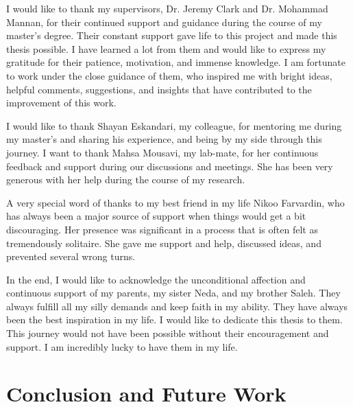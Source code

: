 \documentclass[letterpaper,12pt,onecolumn,final]{report}
\begin{document}
\begin{acknowledgments}
  I would like to thank my supervisors, Dr. Jeremy Clark and Dr. Mohammad Mannan, for their continued support and guidance during the course of my master's degree. Their constant support gave life to this project and made this thesis possible. I have learned a lot from them and would like to express my gratitude for their patience, motivation, and immense knowledge. I am fortunate to work under the close guidance of them, who inspired me with bright ideas, helpful comments, suggestions, and insights that have contributed to the improvement of this work.

  I would like to thank Shayan Eskandari, my colleague, for mentoring me during my master's and sharing his experience, and being by my side through this journey. I want to thank Mahsa Mousavi, my lab-mate, for her continuous feedback and support during our discussions and meetings. She has been very generous with her help during the course of my research.
  
  A very special word of thanks to my best friend in my life Nikoo Farvardin, who has always been a major source of support when things would get a bit discouraging. Her presence was significant in a process that is often felt as tremendously solitaire. She gave me support and help, discussed ideas, and prevented several wrong turns.
  
  In the end, I would like to acknowledge the unconditional affection and continuous support of my parents, my sister Neda, and my brother Saleh. They always fulfill all my silly demands and keep faith in my ability. They have always been the best inspiration in my life. I would like to dedicate this thesis to them. This journey would not have been possible without their encouragement and support. I am incredibly lucky to have them in my life.
\end{acknowledgments}













\chapter{Conclusion and Future Work}
\label{chap:conclusion}
\end{document}
